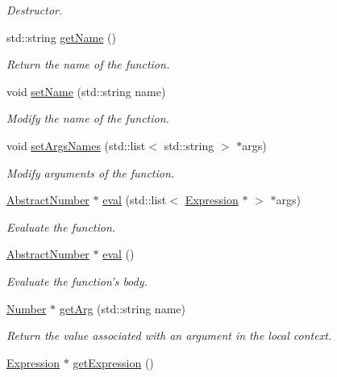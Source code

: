 \begin{DoxyCompactItemize}
\begin{DoxyCompactList}\small\item\em Destructor. \end{DoxyCompactList}\item 
std\-::string \hyperlink{class_function_a5b7d859d767e8a9c19fc5b81a0d10395}{get\-Name} ()
\begin{DoxyCompactList}\small\item\em Return the name of the function. \end{DoxyCompactList}\item 
void \hyperlink{class_function_a31a31e029daa1e11d0d58441bf5eb03f}{set\-Name} (std\-::string name)
\begin{DoxyCompactList}\small\item\em Modify the name of the function. \end{DoxyCompactList}\item 
void \hyperlink{class_function_a7ea0df19722e961d9001f7bfbae5262e}{set\-Args\-Names} (std\-::list$<$ std\-::string $>$ $\ast$args)
\begin{DoxyCompactList}\small\item\em Modify arguments of the function. \end{DoxyCompactList}\item 
\hyperlink{class_abstract_number}{Abstract\-Number} $\ast$ \hyperlink{class_function_af855f870a867e5fadaa23c4fb54bdc2d}{eval} (std\-::list$<$ \hyperlink{class_expression}{Expression} $\ast$ $>$ $\ast$args)
\begin{DoxyCompactList}\small\item\em Evaluate the function. \end{DoxyCompactList}\item 
\hyperlink{class_abstract_number}{Abstract\-Number} $\ast$ \hyperlink{class_function_afb64e5f34ae75847a68ab79c06a553cb}{eval} ()
\begin{DoxyCompactList}\small\item\em Evaluate the function's body. \end{DoxyCompactList}\item 
\hyperlink{class_number}{Number} $\ast$ \hyperlink{class_function_a1d0b8e117cd137e34ab843cc9e28ed53}{get\-Arg} (std\-::string name)
\begin{DoxyCompactList}\small\item\em Return the value associated with an argument in the local context. \end{DoxyCompactList}\item 
\hyperlink{class_expression}{Expression} $\ast$ \hyperlink{class_function_afaaf297558b5d18a51e04e9f5e20d270}{get\-Expression} ()

\end{DoxyCompactItemize}
